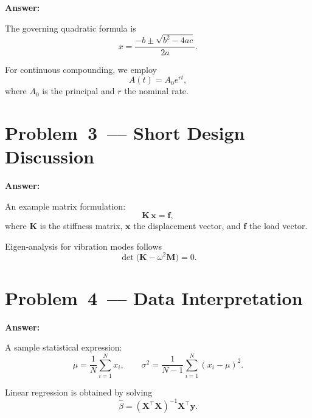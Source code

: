 \documentclass[12pt]{article}
\newenvironment{problem}{\color{dodblue}\itshape}{\par}
\begin{document}
\textbf{Answer:}\\
\lipsum[4]

The governing quadratic formula is
\begin{equation}
\label{eq:quadratic}
x = \frac{-b \pm \sqrt{b^{2}-4ac}}{2a}.
\end{equation}

For continuous compounding, we employ
\begin{equation}
\label{eq:exp}
A(t) = A_0 e^{rt},
\end{equation}
where $A_0$ is the principal and $r$ the nominal rate.

\section*{Problem 3 –– Short Design Discussion}
\begin{problem}
\lipsum[5]
\end{problem}

\textbf{Answer:}\\
\lipsum[6]

An example matrix formulation:
\begin{equation}
\mathbf{K}\,\mathbf{x} = \mathbf{f},
\end{equation}
where $\mathbf{K}$ is the stiffness matrix, $\mathbf{x}$ the displacement vector, and $\mathbf{f}$ the load vector.

Eigen‑analysis for vibration modes follows
\begin{equation}
\det\bigl(\mathbf{K} - \omega^{2}\mathbf{M}\bigr) = 0.
\end{equation}

\section*{Problem 4 –– Data Interpretation}
\begin{problem}
\lipsum[7]
\end{problem}

\textbf{Answer:}\\
\lipsum[8]

A sample statistical expression:
\begin{equation}
\mu = \frac{1}{N}\sum_{i=1}^{N} x_i, \qquad \sigma^{2} = \frac{1}{N-1}\sum_{i=1}^{N}(x_i-\mu)^{2}.
\end{equation}

Linear regression is obtained by solving
\begin{equation}
\hat{\beta} = (\mathbf{X}^{\top}\mathbf{X})^{-1}\mathbf{X}^{\top}\mathbf{y}.
\end{equation}

\end{document}
